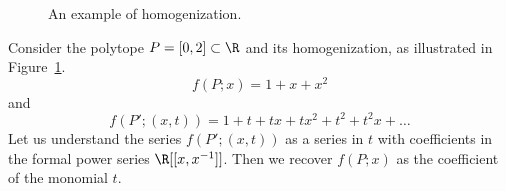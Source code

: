 \begin{figure}
  \begin{center}
  \end{center}
  \caption{An example of homogenization.}
  \label{fig:generating-series-homogenization}
\end{figure}

\begin{example}
  Consider the polytope $P = [0,2] \subset \R$ and its homogenization,
  as illustrated in Figure~\ref{fig:generating-series-homogenization}.
  \[
    f(P;x) = 1 + x + x^2
  \]
  and
  \[
    f(P';(x,t)) = 1 + t + tx + tx^2 + t^2 + t^2x + \dots
  \]
  Let us understand the series $f(P';(x,t))$ as a series in $t$ with coefficients in the formal power series $\R[[x,x^{-1}]]$.
  Then we recover $f(P;x)$ as the coefficient of the monomial $t$.
\end{example}

